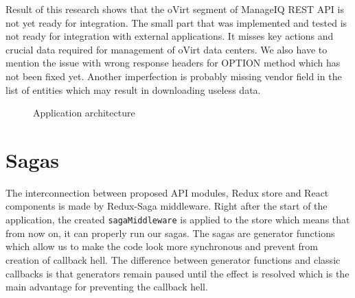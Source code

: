 Result of this research shows that the oVirt segment of ManageIQ REST API is not yet ready for integration. The small part that was implemented and tested is not ready for integration with external applications. It misses key actions and crucial data required for management of oVirt data centers. We also have to mention the issue with wrong response headers for OPTION method which has not been fixed yet. Another imperfection is probably missing vendor field in the list of entities which may result in downloading useless data.

\begin{figure}[h]
\caption{Application architecture}
\label{app_architecture}
\end{figure}

\section{Sagas}
The interconnection between proposed API modules, Redux store and React components is made by Redux-Saga middleware. Right after the start of the application, the created \texttt{sagaMiddleware} is applied to the store which means that from now on, it can properly run our sagas. The sagas are generator functions which allow us to make the code look more synchronous and prevent from creation of callback hell. The difference between generator functions and classic callbacks is that generators remain paused until the effect is resolved which is the main advantage for preventing the callback hell.

